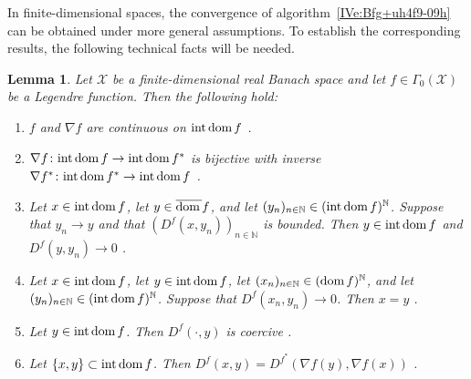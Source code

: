 \documentclass[a4paper,11pt,fleqn]{article}
\newcommand{\XX}{\ensuremath{{\mathcal X}}}
\newcommand{\NN}{\ensuremath{\mathbb N}}
\newcommand{\dom}{\ensuremath{\text{\rm dom}\,}}
\newcommand{\intdom}{\ensuremath{\text{\rm int\,dom}\,}}
\newtheorem{lemma}[theorem]{Lemma}
\theoremstyle{plain}{\theorembodyfont{\rmfamily}%
\newtheorem{conjecture}[theorem]{Conjecture}}
\theoremstyle{plain}{\theorembodyfont{\rmfamily}%
\newtheorem{example}[theorem]{Example}}
\theoremstyle{plain}{\theorembodyfont{\rmfamily}%
\newtheorem{remark}[theorem]{Remark}}
\theoremstyle{plain}{\theorembodyfont{\rmfamily}%
\newtheorem{algorithm}[theorem]{Algorithm}}
\theoremstyle{plain}{\theorembodyfont{\rmfamily}%
\newtheorem{condition}[theorem]{Condition}}
\theoremstyle{plain}{\theorembodyfont{\rmfamily}%
\newtheorem{definition}[theorem]{Definition}}
\theoremstyle{plain}{\theorembodyfont{\rmfamily}
\newtheorem{problem}[theorem]{Problem}}
\theoremstyle{plain}{\theorembodyfont{\rmfamily}
\newtheorem{notation}[theorem]{Notation}}
\numberwithin{equation}{section}
\begin{document}
In finite-dimensional spaces, the convergence of 
algorithm~\eqref{IVe:Bfg+uh4f9-09h} can be obtained 
under more general assumptions. To establish the corresponding
results, the following technical facts will be needed.

\begin{lemma}
\label{lkIuh727}
Let $\XX$ be a finite-dimensional real Banach space and let
$f\in\Gamma_0(\XX)$ be a Legendre function. Then the following
hold:
\begin{enumerate}
\item
\label{lkIuh727i--}
$f$ and $\nabla f$ are continuous on $\intdom f$
{\rm \cite[Corollaries~8.30(iii),~17.34, and~17.35]{Livre1}}.
\item
\label{lkIuh727i-}
$\nabla f\colon\intdom f\to\intdom f^*$ is bijective with inverse
$\nabla f^*\colon\intdom f^*\to\intdom f$
{\rm \cite[Theorem~5.10]{Ccm01}}.
\item
\label{lkIuh727i}
Let $x\in\intdom f$, let $y\in\overline{\dom}f$, and let 
$(y_n)_{n\in\NN}\in(\intdom f)^{\NN}$. Suppose that $y_n\to y$
and that $(D^f(x,y_n))_{n\in\NN}$ is bounded. Then $y\in\intdom f$
and $D^f(y,y_n)\to 0$ {\rm \cite[Theorem~3.8(ii)]{BB97}}.
\item
\label{lkIuh727ii}
Let $x\in\intdom f$, let $y\in\intdom f$, let 
$(x_n)_{n\in\NN}\in(\dom f)^{\NN}$, and let
$(y_n)_{n\in\NN}\in(\intdom f)^{\NN}$. Suppose that 
$D^f(x_n,y_n)\to 0$. Then $x=y$
{\rm \cite[Theorem~3.9(iii)]{BB97}}.
\item
\label{lkIuh727iii}
Let $y\in\intdom f$. Then $D^f(\cdot,y)$ is coercive
{\rm \cite[Lemma~7.3(v)]{Ccm01}}.
\item
\label{lkIuh727iv}
Let $\{x,y\}\subset\intdom f$. Then 
$D^f(x,y)=D^{f^*}(\nabla f(y),\nabla f(x))$
{\rm \cite[Lemma~7.3(vii)]{Ccm01}}.
\end{enumerate}
\end{lemma}
\end{document}
